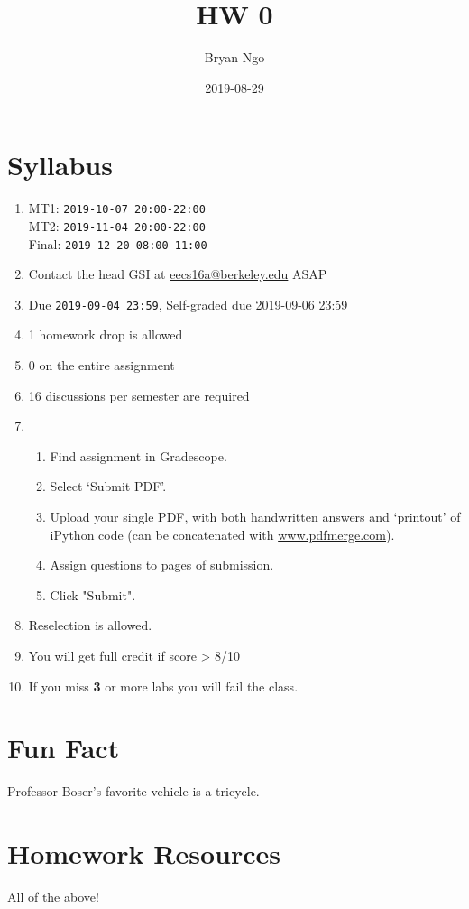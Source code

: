 \documentclass[]{article}
\title{HW 0}
\author{Bryan Ngo}
\date{2019-08-29}
\begin{document}
\maketitle

\section{Syllabus}

\begin{enumerate}[label=(\alph*)]
	\item MT1: \texttt{2019-10-07 20:00-22:00} \\
	MT2: \texttt{2019-11-04 20:00-22:00} \\
	Final: \texttt{2019-12-20 08:00-11:00}
	\item Contact the head GSI at \url{eecs16a@berkeley.edu} ASAP
	\item Due \texttt{2019-09-04 23:59}, Self-graded due 2019-09-06 23:59
	\item 1 homework drop is allowed
	\item 0 on the entire assignment
	\item 16 discussions per semester are required
	\item 
		\begin{enumerate}[label=(\arabic*)]
			\item Find assignment in Gradescope.
			\item Select ‘Submit PDF’.
			\item Upload your single PDF, with both handwritten answers and ‘printout’ of iPython code (can be concatenated with \url{www.pdfmerge.com}).
			\item Assign questions to pages of submission.
			\item Click "Submit".
		\end{enumerate}
	\item Reselection is allowed. 
	\item You will get full credit if score > 8/10
	\item If you miss \textbf{3} or more labs you will fail the class.
\end{enumerate}

\section{Fun Fact}

Professor Boser's favorite vehicle is a tricycle. 

\section{Homework Resources}

All of the above!
\end{document}
